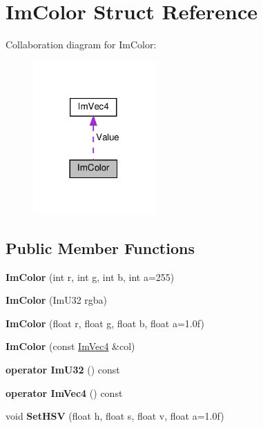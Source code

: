 \hypertarget{structImColor}{}\section{Im\+Color Struct Reference}
\label{structImColor}


Collaboration diagram for Im\+Color\+:\nopagebreak
\begin{figure}[H]
\begin{center}
\leavevmode
\includegraphics[width=134pt]{structImColor__coll__graph}
\end{center}
\end{figure}
\subsection*{Public Member Functions}
\begin{DoxyCompactItemize}
\item 
\mbox{\label{structImColor_ab4ba02f8290d5dadc1ebc57b2c8a9cbe}} 
{\bfseries Im\+Color} (int r, int g, int b, int a=255)
\item 
\mbox{\label{structImColor_ad306332841a2b1f903f40262a19f9412}} 
{\bfseries Im\+Color} (Im\+U32 rgba)
\item 
\mbox{\label{structImColor_a92b53917ca9d90a7207b18270ff5453d}} 
{\bfseries Im\+Color} (float r, float g, float b, float a=1.\+0f)
\item 
\mbox{\label{structImColor_aa5306926b3ef766a8647b26bdfd9f8d2}} 
{\bfseries Im\+Color} (const \hyperlink{structImVec4}{Im\+Vec4} \&col)
\item 
\mbox{\label{structImColor_a4f4fc53e0676d50404d6d5ffcf16637f}} 
{\bfseries operator Im\+U32} () const
\item 
\mbox{\label{structImColor_a10f1de242f13c93f8be64545e4cbcb0a}} 
{\bfseries operator Im\+Vec4} () const
\item 
\mbox{\label{structImColor_afcff20160db703b956d56e5a9fa88e24}} 
void {\bfseries Set\+H\+SV} (float h, float s, float v, float a=1.\+0f)
\end{DoxyCompactItemize}
